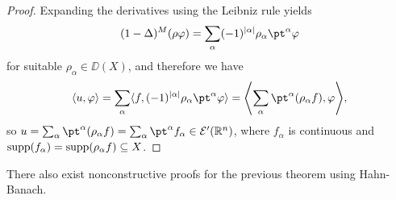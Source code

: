 \begin{proof}
Expanding the derivatives using the Leibniz rule yields
\[
(1 -\Delta)^M (\rho\phi) = \sum_\alpha (-1)^{\abs{\alpha}} \rho_\alpha \pt^\alpha\phi
\]
for suitable $\rho_\alpha \in \DD(X)$, and therefore we have
\[
\ang{u, \phi} = \sum_\alpha \ang{f, (-1)^{\abs{\alpha}} \rho_\alpha \pt^\alpha\phi} = \ang*{\sum_\alpha \pt^\alpha(\rho_\alpha f), \phi},
\]
so $u = \sum_\alpha \pt^\alpha(\rho_\alpha f) = \sum_\alpha \pt^\alpha f_\alpha \in \EE'(\RR^n)$, where $f_\alpha$ is continuous and $\operatorname{supp}(f_\alpha) = \operatorname{supp}(\rho_\alpha f) \subseteq X$. 
\end{proof}

There also exist nonconstructive proofs for the previous theorem using Hahn-Banach. 